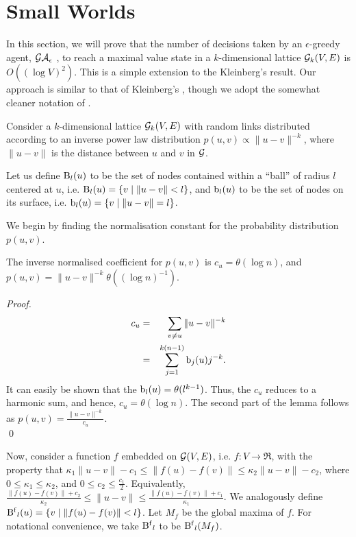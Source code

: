 \section{Small Worlds}
\label{sec:small-worlds}

In this section, we will prove that the number of decisions taken by
an $\epsilon$-greedy agent, $\mathcal{GA}_{\epsilon}~$, to reach a maximal value
state in a $k$-dimensional lattice $\mathcal{G}_k(V,E)$ is $O( (\log
V)^2)$. This is a simple extension to the Kleinberg's result. Our
approach is similar to that of Kleinberg's \cite{Kleinberg}, though we
adopt the somewhat cleaner notation of \cite{Martel2004}.

Consider a $k$-dimensional lattice $\mathcal{G}_k(V,E)$ with random links distributed
according to an inverse power law distribution $p(u,v) \propto \|u-v\|^{-k}$,
where $\|u - v\|$ is the distance between $u$ and $v$ in $\mathcal{G}$. 

\begin{definition}
Let us define $\operatorname{B}_l(u)$ to be the set of nodes contained within a
``ball'' of radius $l$ centered at $u$, i.e.  $\operatorname{B}_l(u) = \{ v \mid
\|u - v\| < l \}$, and $\operatorname{b}_l(u)$ to be the set of nodes on its
surface, i.e. $\operatorname{b}_l(u) = \{ v \mid \|u - v\| = l \}$.
\end{definition}

We begin by finding the normalisation constant for the probability
distribution $p(u,v)$.

\begin{lemma}
    The inverse normalised coefficient for $p(u,v)$ is $c_u = \theta(
    \log n )$, and $p(u,v) = \|u - v\|^{-k} \theta( (\log n)^{-1} )$.
\end{lemma}
\begin{proof}
    \begin{eqnarray*}
        c_u &=& \sum_{v \ne u} \|u - v\|^{-k} \\
            &=& \sum_{j=1}^{k(n-1)} \operatorname{b}_j(u) j^{-k}.
    \end{eqnarray*}
    It can easily be shown that the $\operatorname{b}_l(u) = \theta( l^{k-1} )$.
    Thus, the $c_u$ reduces to a harmonic sum, and hence, $c_u =
    \theta( \log n )$.  The second part of the lemma follows as
    $p(u,v) = \frac{ \|u - v\|^{-k} }{c_u}$. 
    \\ \qed
\end{proof}

Now, consider a function $f$ embedded on $\mathcal{G}(V,E)$, i.e. $f : V
\to \Re$, with the property that $\kappa_1 \|u-v\| - c_1 \le \|f(u) -
f(v)\| \le \kappa_2 \|u - v\| - c_2$, where $0 \le \kappa_1 \le
\kappa_2$, and $0 \le c_2 \le \frac{c_1}{2}$. Equivalently,
$\frac{\|f(u)-f(v)\| + c_2}{\kappa_2} \le \|u - v\| \le
\frac{\|f(u)-f(v)\| + c_1}{\kappa_1}$. We analogously define
$\operatorname{B^{f}}_l(u) = \{ v \mid \|f(u) - f(v)\| < l \}$. Let $M_f$ be the
global maxima of $f$. For notational convenience, we take $\operatorname{B^{f}}_l$
to be $\operatorname{B^{f}}_l(M_f)$.

